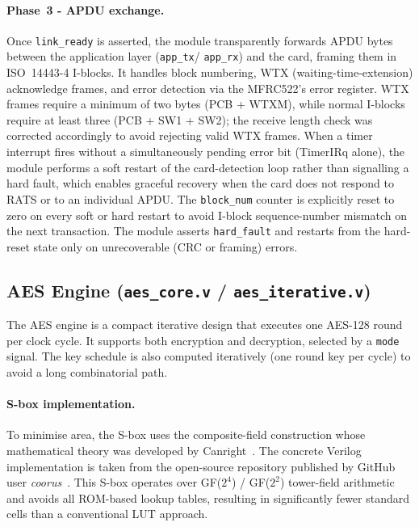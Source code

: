 \documentclass[manuscript,screen,nonacm]{acmart}
\begin{document}
\paragraph{Phase~3 - APDU exchange.}
Once \texttt{link\_ready} is asserted, the module transparently
forwards APDU bytes between the application layer (\texttt{app\_tx}/
\texttt{app\_rx}) and the card, framing them in ISO~14443-4 I-blocks.
It handles block numbering, WTX (waiting-time-extension) acknowledge
frames, and error detection via the MFRC522's error register.
WTX frames require a minimum of two bytes (PCB + WTXM), while
normal I-blocks require at least three (PCB + SW1 + SW2); the
receive length check was corrected accordingly to avoid rejecting
valid WTX frames.
When a timer interrupt fires without a simultaneously pending
error bit (TimerIRq alone), the module performs a soft restart
of the card-detection loop rather than signalling a hard fault,
which enables graceful recovery when the card does not respond to
RATS or to an individual APDU.
The \texttt{block\_num} counter is explicitly reset to zero on
every soft or hard restart to avoid I-block sequence-number
mismatch on the next transaction.
The module asserts \texttt{hard\_fault} and restarts from the
hard-reset state only on unrecoverable (CRC or framing) errors.


\subsection{AES Engine (\texttt{aes\_core.v} / \texttt{aes\_iterative.v})}
\label{sec:impl:aes}

The AES engine is a compact iterative design that executes one
AES-128 round per clock cycle.
It supports both encryption and decryption, selected by a \texttt{mode}
signal.
The key schedule is also computed iteratively (one round key per cycle)
to avoid a long combinatorial path.

\paragraph{S-box implementation.}
To minimise area, the S-box uses the composite-field construction
whose mathematical theory was developed by Canright~\cite{canright2005}.
The concrete Verilog implementation is taken from the open-source
repository published by GitHub user \emph{coorus}~\cite{canright_github}.
This S-box operates over GF($2^4$) / GF($2^2$) tower-field arithmetic
and avoids all ROM-based lookup tables, resulting in significantly
fewer standard cells than a conventional LUT approach.
\end{document}
